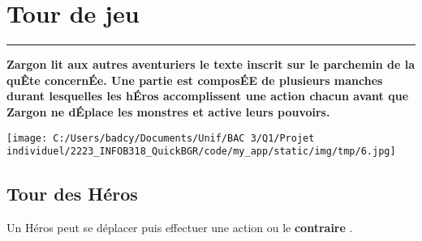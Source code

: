 \documentclass{scrartcl}%
\begin{document}
%
\section{ Tour de jeu
}%
\label{sec:Tourdejeu}%
\rule{18cm}{0.07cm}\break%
\textbf{Zargon lit aux autres aventuriers le texte inscrit sur le parchemin de la quÊte concernÉe. Une partie est composÉE de plusieurs manches durant lesquelles les hÉros accomplissent une action chacun avant que Zargon ne dÉplace les monstres et active leurs pouvoirs.}%

%
%
\begin{center}\texttt{[image: C:/Users/badcy/Documents/Unif/BAC 3/Q1/Projet individuel/2223\_INFOB318\_QuickBGR/code/my\_app/static/img/tmp/6.jpg]}\end{center}%



%
\subsection{ Tour des Héros
}%
\label{subsec:TourdesHros}%
Un Héros peut se déplacer puis effectuer une action ou le %
\textbf{contraire}%
. 


%
\end{document}
